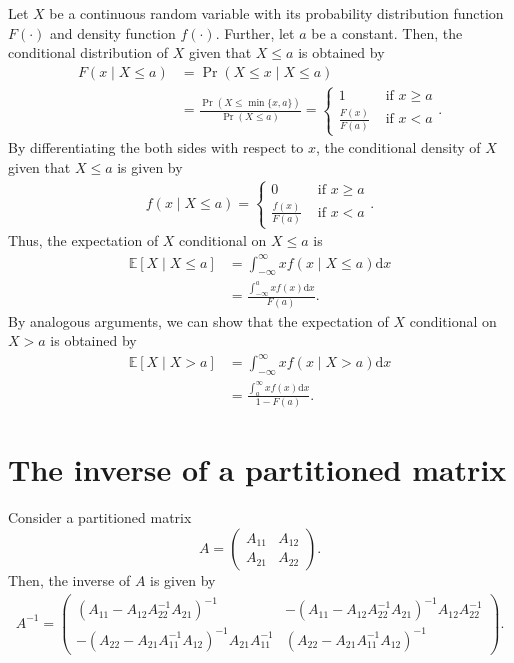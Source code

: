 \documentclass[10.5pt, A4paper, openany, uplatex]{book}
\newcommand{\mrm}{\mathrm}
\newcommand{\E}{\mathbb{E}}
\numberwithin{equation}{section}
\begin{document}
\begin{appendices}
	Let $X$ be a continuous random variable with its probability distribution function $F(\cdot)$ and density function $f(\cdot)$.
	Further, let $a$ be a constant.
	Then, the conditional distribution of $X$ given that $X \leq a$ is obtained by
	\begin{align*}
	F(x \mid X \leq a)
	& = \Pr(X \leq x \mid X \leq a)\\
	& = \frac{\Pr(X \leq \min\{x, a\})}{\Pr(X \leq a)} = \left\{\begin{array}{cl}
	1 & \text{ if $x \geq a$} \\ 
	\frac{F(x)}{F(a)} & \text{ if $x < a$}
	\end{array}	\right. .
	\end{align*}
	By differentiating the both sides with respect to $x$, the conditional density of $X$ given that $X \leq a$ is given by
	\begin{align*}
	f(x \mid X \leq a) = \left\{\begin{array}{cl}
	0 & \text{ if $x \geq a$} \\ 
	\frac{f(x)}{F(a)} & \text{ if $x < a$}
	\end{array}	\right. .
	\end{align*}
	Thus, the expectation of $X$ conditional on $X \leq a$ is
	\begin{align*}
	\E[X \mid X \leq a] 
	& = \int_{-\infty}^{\infty} x f(x \mid X \leq a) \mrm{d}x \\
	& = \frac{\int_{-\infty}^a x f(x) \mrm{d}x}{F(a)}.
	\end{align*}
	By analogous arguments, we can show that the expectation of $X$ conditional on $X > a$ is obtained by
	\begin{align*}
	\E[X \mid X > a] 
	& = \int_{-\infty}^{\infty} x f(x \mid X > a) \mrm{d}x \\
	& = \frac{\int_a^\infty x f(x) \mrm{d}x}{1 - F(a)}.
	\end{align*}
	
	\section{The inverse of a partitioned matrix}
	Consider a partitioned matrix
	\[
		A = \left(\begin{array}{cc}
		A_{11} & A_{12} \\
		A_{21} & A_{22}
	\end{array}	\right).
	\]
	Then, the inverse of $A$ is given by
	\begin{align}\label{eq:inverse}
		A^{-1} = \left(\begin{array}{cc}
		(A_{11} - A_{12}A_{22}^{-1}A_{21})^{-1} & -(A_{11} - A_{12}A_{22}^{-1}A_{21})^{-1}A_{12}A_{22}^{-1} \\
		-(A_{22} - A_{21}A_{11}^{-1}A_{12})^{-1}A_{21}A_{11}^{-1} & (A_{22} - A_{21}A_{11}^{-1}A_{12})^{-1}
	\end{array} \right).
	\end{align}
	\end{appendices}
	

\clearpage	


\printindex
\end{document}

